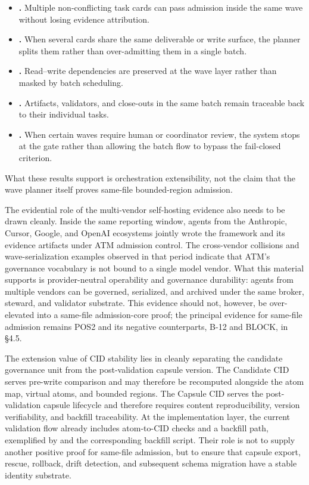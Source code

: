\documentclass[9pt,letterpaper]{extarticle}
\begin{document}
\begin{itemize}
\item \textbf{\texttt{}.} Multiple non-conflicting task cards can pass admission inside the same wave without losing evidence attribution.
\item \textbf{\texttt{}.} When several cards share the same deliverable or write surface, the planner splits them rather than over-admitting them in a single batch.
\item \textbf{\texttt{}.} Read--write dependencies are preserved at the wave layer rather than masked by batch scheduling.
\item \textbf{\texttt{}.} Artifacts, validators, and close-outs in the same batch remain traceable back to their individual tasks.
\item \textbf{\texttt{}.} When certain waves require human or coordinator review, the system stops at the gate rather than allowing the batch flow to bypass the fail-closed criterion.
\end{itemize}

What these results support is orchestration extensibility, not the claim that {}the wave planner itself proves same-file bounded-region admission{}.

The evidential role of the multi-vendor self-hosting evidence also needs to be drawn cleanly. Inside the same reporting window, agents from the Anthropic, Cursor, Google, and OpenAI ecosystems jointly wrote the framework and its evidence artifacts under ATM admission control. The cross-vendor collisions and wave-serialization examples observed in that period indicate that ATM's governance vocabulary is not bound to a single model vendor. What this material supports is provider-neutral operability and governance durability: agents from multiple vendors can be governed, serialized, and archived under the same broker, steward, and validator substrate. This evidence should not, however, be over-elevated into a same-file admission-core proof; the principal evidence for same-file admission remains POS2 and its negative counterparts, B-12 and BLOCK, in §4.5.

The extension value of CID stability lies in cleanly separating the candidate governance unit from the post-validation capsule version. The Candidate CID serves pre-write comparison and may therefore be recomputed alongside the atom map, virtual atoms, and bounded regions. The Capsule CID serves the post-validation capsule lifecycle and therefore requires content reproducibility, version verifiability, and backfill traceability. At the implementation layer, the current validation flow already includes atom-to-CID checks and a backfill path, exemplified by \texttt{} and the corresponding backfill script. Their role is not to supply another positive proof for same-file admission, but to ensure that capsule export, rescue, rollback, drift detection, and subsequent schema migration have a stable identity substrate.
\end{document}

